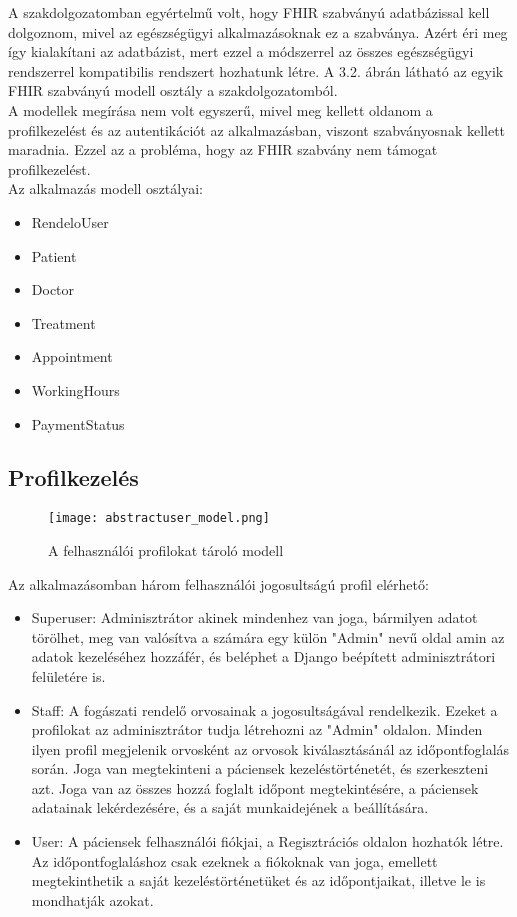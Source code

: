A szakdolgozatomban egyértelmű volt, hogy FHIR szabványú adatbázissal kell dolgoznom, mivel az egészségügyi alkalmazásoknak ez a szabványa. Azért éri meg így kialakítani az adatbázist, mert ezzel a módszerrel az összes egészségügyi rendszerrel kompatibilis rendszert hozhatunk létre. A 3.2. ábrán látható az egyik FHIR szabványú modell osztály a szakdolgozatomból.\\
A modellek megírása nem volt egyszerű, mivel meg kellett oldanom a profilkezelést és az autentikációt az alkalmazásban, viszont szabványosnak kellett maradnia. Ezzel az a probléma, hogy az FHIR szabvány nem támogat profilkezelést.\\
Az alkalmazás modell osztályai:
\begin{itemize}
	\item RendeloUser
	\item Patient
	\item Doctor
	\item Treatment
	\item Appointment
	\item WorkingHours
	\item PaymentStatus
\end{itemize}

\subsection{Profilkezelés}

\begin{figure}[H]
	\caption{A felhasználói profilokat tároló modell}
	\label{fig:profilmodell}
	\centering
	\texttt{[image: abstractuser\_model.png]}
\end{figure}

Az alkalmazásomban három felhasználói jogosultságú profil elérhető:

\begin{itemize}
	\item Superuser: Adminisztrátor akinek mindenhez van joga, bármilyen adatot törölhet, meg van valósítva a számára egy külön "Admin" nevű oldal amin az adatok kezeléséhez hozzáfér, és beléphet a Django beépített adminisztrátori felületére is.
	\item Staff: A fogászati rendelő orvosainak a jogosultságával rendelkezik. Ezeket a profilokat az adminisztrátor tudja létrehozni az "Admin" oldalon. Minden ilyen profil megjelenik orvosként az orvosok kiválasztásánál az időpontfoglalás során. Joga van megtekinteni a páciensek kezeléstörténetét, és szerkeszteni azt. Joga van az összes hozzá foglalt időpont megtekintésére, a páciensek adatainak lekérdezésére, és a saját munkaidejének a beállítására.
	\item User: A páciensek felhasználói fiókjai, a Regisztrációs oldalon hozhatók létre. Az időpontfoglaláshoz csak ezeknek a fiókoknak van joga, emellett megtekinthetik a saját kezeléstörténetüket és az időpontjaikat, illetve le is mondhatják azokat.
\end{itemize}

